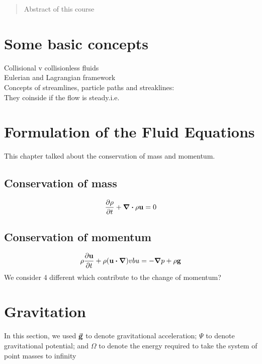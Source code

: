 \documentclass[12pt,a4paper]{article}
\begin{document}
\begin{titlepage}
    \maketitle
\end{titlepage}

\tableofcontents

\newpage

\begin{abstract}
\noindent
Abstract of this course
\end{abstract}
\section{Some basic concepts}
Collisional v collisionless fluids\\
Eulerian and Lagrangian framework\\
Concepts of streamlines, particle paths and streaklines:\\
They coinside if the flow is steady.i.e. \\
\section{Formulation of the Fluid Equations}
This chapter talked about the conservation of mass and momentum.
\subsection{Conservation of mass}
\begin{equation}
    \pdv{\rho}{t} + \div{\rho \vb{u}} = 0
\end{equation}
\subsection{Conservation of momentum}
\begin{equation}
    \rho \pdv{\vb{u}}{t} + \rho (\vb{u}\dotproduct \grad)vb{u} = -\grad{p}+ \rho \vb{g}
\end{equation}
We consider 4 different which contribute to the change of momentum?
\section{Gravitation}
In this section, 
we used $\va{g}$ to denote gravitational acceleration; 
$\Psi$ to denote gravitational potential;
and $\Omega$ to denote the energy required to take the system of point masses to infinity\\
\\
\end{document}
